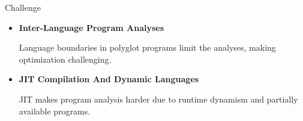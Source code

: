 \begin{roundedalertblock}{Challenge}
    \vspace{5mm}
    \baselineskip 50pt

    \begin{itemize}
        \item \textbf{Inter-Language Program Analyses}\par
            Language boundaries in polyglot programs limit the analyses, making optimization challenging.
        \item \textbf{JIT Compilation And Dynamic Languages}\par
        JIT makes program analysis harder due to runtime dynamism and partially available programs.\par
    \end{itemize}

\end{roundedalertblock}
